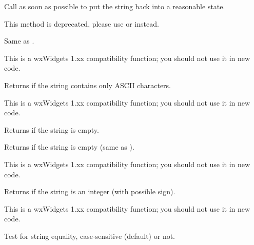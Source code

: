 Call  as soon as
possible to put the string back into a reasonable state.

This method is deprecated, please use
 or
 instead.


\label{wxstringindex}



Same as .

This is a wxWidgets 1.xx compatibility function; you should not use it in new code.


\label{wxstringisascii}


Returns \true if the string contains only ASCII characters.

This is a wxWidgets 1.xx compatibility function; you should not use it in new code.


\label{wxstringisempty}


Returns \true if the string is empty.


\label{wxstringisnull}


Returns \true if the string is empty (same as ).

This is a wxWidgets 1.xx compatibility function; you should not use it in new code.


\label{wxstringisnumber}


Returns \true if the string is an integer (with possible sign).

This is a wxWidgets 1.xx compatibility function; you should not use it in new code.


\label{wxstringissameas}


Test for string equality, case-sensitive (default) or not.

